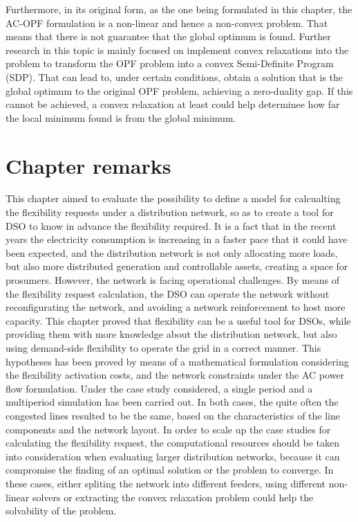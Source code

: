 Furthermore, in its original form, as the one being formulated in this chapter, the AC-OPF formulation is a non-linear and hence a non-convex problem. That means that there is not guarantee that the global optimum is found. Further research in this topic is mainly focused on implement convex relaxations into the problem to transform the OPF problem into a convex Semi-Definite Program (SDP). That can lead to, under certain conditions, obtain a solution that is the global optimum to the original OPF problem, achieving a zero-duality gap. If this cannot be achieved, a convex relaxation at least could help determinee how far the local minimum found is from the global minimum.  


\section{Chapter remarks}
This chapter aimed to evaluate the possibility to define a model for calcualting the flexibility requests under a distribution network, so as to create a tool for DSO to know in advance the flexibility required. It is a fact that in the recent years the electricity consumption is increasing in a faster pace that it could have been expected, and the distribution network is not only allocating more loads, but also more distributed generation and controllable assets, creating a space for prosumers. However, the network is facing operational challenges. By means of the flexibility request calculation, the DSO can operate the network without reconfigurating the network, and avoiding a network reinforcement to host more capacity. 
This chapter proved that flexibility can be a useful tool for DSOs, while providing them with more knowledge about the distribution network, but also using demand-side flexibility to operate the grid in a correct manner. 
This hypotheses has been proved by means of a mathematical formulation considering the flexibility activation costs, and the network constraints under the AC power flow formulation. Under the case study considered, a single period and a multiperiod simulation has been carried out. In both cases, the quite often the congested lines resulted to be the same, based on the characteristics of the line components and the network layout.
In order to scale up the case studies for calculating the flexibility request, the computational resources should be taken into consideration when evaluating larger distribution networks, because it can compromise the finding of an optimal solution or the problem to converge. In these cases, either spliting the network into different feeders, using different non-linear solvers or extracting the convex relaxation problem could help the solvability of the problem. 
